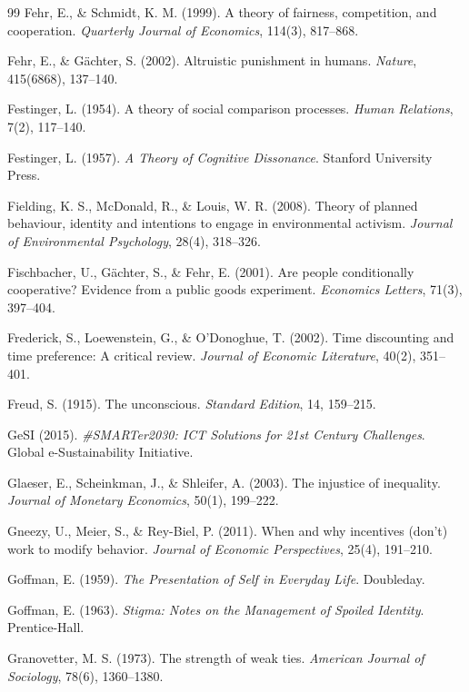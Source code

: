 \begin{thebibliography}{99}
Fehr, E., \& Schmidt, K. M. (1999).
A theory of fairness, competition, and cooperation.
\textit{Quarterly Journal of Economics}, 114(3), 817--868.

Fehr, E., \& Gächter, S. (2002).
Altruistic punishment in humans.
\textit{Nature}, 415(6868), 137--140.

Festinger, L. (1954).
A theory of social comparison processes.
\textit{Human Relations}, 7(2), 117--140.

Festinger, L. (1957).
\textit{A Theory of Cognitive Dissonance}.
Stanford University Press.

Fielding, K. S., McDonald, R., \& Louis, W. R. (2008).
Theory of planned behaviour, identity and intentions to engage in environmental activism.
\textit{Journal of Environmental Psychology}, 28(4), 318--326.

Fischbacher, U., Gächter, S., \& Fehr, E. (2001).
Are people conditionally cooperative? Evidence from a public goods experiment.
\textit{Economics Letters}, 71(3), 397--404.

Frederick, S., Loewenstein, G., \& O'Donoghue, T. (2002).
Time discounting and time preference: A critical review.
\textit{Journal of Economic Literature}, 40(2), 351--401.

Freud, S. (1915).
The unconscious.
\textit{Standard Edition}, 14, 159--215.

GeSI (2015).
\textit{\#SMARTer2030: ICT Solutions for 21st Century Challenges}.
Global e-Sustainability Initiative.

Glaeser, E., Scheinkman, J., \& Shleifer, A. (2003).
The injustice of inequality.
\textit{Journal of Monetary Economics}, 50(1), 199--222.

Gneezy, U., Meier, S., \& Rey-Biel, P. (2011).
When and why incentives (don't) work to modify behavior.
\textit{Journal of Economic Perspectives}, 25(4), 191--210.

Goffman, E. (1959).
\textit{The Presentation of Self in Everyday Life}.
Doubleday.

Goffman, E. (1963).
\textit{Stigma: Notes on the Management of Spoiled Identity}.
Prentice-Hall.

Granovetter, M. S. (1973).
The strength of weak ties.
\textit{American Journal of Sociology}, 78(6), 1360--1380.


\end{thebibliography}
